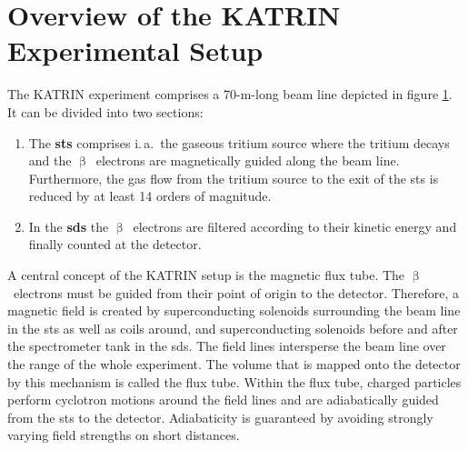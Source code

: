 \section{Overview of the KATRIN Experimental Setup}
\label{sec:katrinExpSetupOverview}
\begin{figure}[t]
	\label{fig:katrinExpSetupBeamline}
\end{figure}
The KATRIN experiment comprises a 70-m-long beam line depicted in figure \ref{fig:katrinExpSetupBeamline}. It can be divided into two sections: 
\begin{enumerate}
	\item The \textbf{\gls{sts}} comprises i.\,a.~the gaseous tritium source where the tritium decays and the $\upbeta$~electrons are magnetically guided along the beam line. Furthermore, the gas flow from the tritium source to the exit of the \gls{sts} is reduced by at least 14 orders of magnitude.
	\item In the \textbf{\gls{sds}} the $\upbeta$~electrons are filtered according to their kinetic energy and finally counted at the detector.
\end{enumerate}
A central concept of the KATRIN setup is the magnetic flux tube. The $\upbeta$~electrons must be guided from their point of origin to the detector. Therefore, a magnetic field is created by superconducting solenoids surrounding the beam line in the \gls{sts} as well as coils around, and superconducting solenoids before and after the spectrometer tank in the \gls{sds}. The field lines intersperse the beam line over the range of the whole experiment. The volume that is mapped onto the detector by this mechanism is called the flux tube. Within the flux tube, charged particles perform cyclotron motions around the field lines and are adiabatically guided from the \gls{sts} to the detector. Adiabaticity is guaranteed by avoiding strongly varying field strengths on short distances. 

